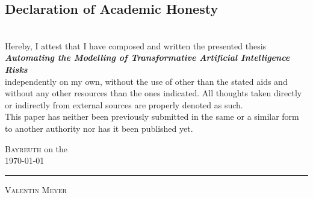 \documentclass[
  letterpaper,
]{book}
\begin{document}
    \subsection*{\Large Declaration of Academic Honesty}
	    \vspace{1cm}\noindent \\
	    Hereby, I attest that I have composed and written the presented thesis 
        \vspace*{0.5cm}\noindent \\
        \textit{ \textbf{ Automating the Modelling of Transformative Artificial Intelligence Risks }}
        \vspace*{0.5cm}\noindent \\
        independently on my own, without the use of other than the stated aids and without any other resources than the ones indicated. All thoughts taken directly or indirectly from external sources are properly denoted as such.
	    \vspace{\baselineskip}
	    \\  This paper has neither been previously submitted in the same or a similar form to another authority nor has it been published yet.
	    \vspace{2cm}
	    
    \flushright
    \begin{minipage}{0.5\textwidth}
        \begin{flushleft} \large
        \textsc{Bayreuth}                     %
        on the \\ %
        \today           %
        \vspace{2cm}\\
    	{\rule[-3pt]{\linewidth}{.4pt}\par\smallskip  
        \textsc{Valentin Meyer}	\\         %
    	}
        \end{flushleft}
        \end{minipage}
\end{document}
